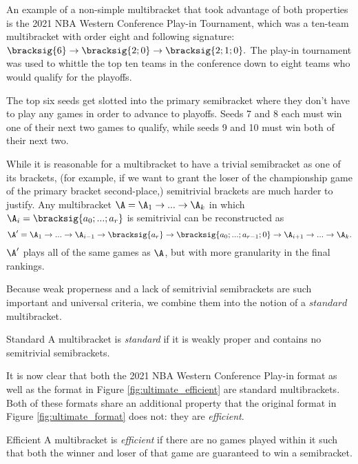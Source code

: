 {    An example of a non-simple multibracket that took advantage of both properties is the 2021 NBA Western Conference Play-in Tournament, which was a ten-team multibracket with order eight and following signature:
    $\bracksig{6} \to \bracksig{2;0} \to \bracksig{2;1;0}.$ The play-in tournament was used to whittle the top ten teams in the conference down to eight teams who would qualify for the playoffs.


    The top six seeds get slotted into the primary semibracket where they don't have to play any games in order to advance to playoffs. Seeds 7 and 8 each must win one of their next two games to qualify, while seeds 9 and 10 must win both of their next two.

    While it is reasonable for a multibracket to have a trivial semibracket as one of its brackets, (for example, if we want to grant the loser of the championship game of the primary bracket second-place,) semitrivial brackets are much harder to justify. Any multibracket $\A = \A_1 \to ... \to \A_k$ in which $\A_i = \bracksig{a_0; ...; a_r}$ is semitrivial can be reconstructed as $$\A' = \A_1 \to ... \to \A_{i-1} \to \bracksig{a_r} \to \bracksig{a_0; ...; a_{r-1}; 0} \to \A_{i+1} \to ... \to \A_k.$$ $\A'$ plays all of the same games as $\A$, but with more granularity in the final rankings.

    Because weak properness and a lack of semitrivial semibrackets are such important and universal criteria, we combine them into the notion of a $\textit{standard}$ multibracket.

    \begin{definition}{Standard}{}
        A multibracket is \textit{standard} if it is weakly proper and contains no semitrivial semibrackets.
    \end{definition}

    It is now clear that both the 2021 NBA Western Conference Play-in format as well as the format in Figure \ref{fig:ultimate_efficient} are standard multibrackets. Both of these formats share an additional property that the original format in Figure \ref{fig:ultimate_format} does not: they are \textit{efficient}.

    \begin{definition}{Efficient}{}
        A multibracket is \textit{efficient} if there are no games played within it such that both the winner and loser of that game are guaranteed to win a semibracket.
    \end{definition}

}

